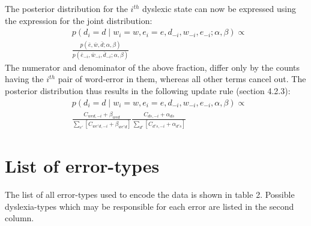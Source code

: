 The posterior distribution for the $i^{th}$ dyslexic state can now be expressed using the expression for the joint distribution:
\begin{equation*}
\begin{split}
&p(d_i=d\mid w_i=w, e_i=e, d_{-i}, w_{-i}, e_{-i}; \alpha, \beta) \propto \\
&\frac{p(\bar{e},\bar{w},\bar{d};\alpha,\beta)}{p(\bar{e}_{-i},\bar{w}_{-i},\bar{d}_{-i};\alpha,\beta)}
\end{split}
\end{equation*}
The numerator and denominator of the above fraction, differ only by the counts having the $i^{th}$ pair of word-error in them, whereas all other terms cancel out. The posterior distribution thus results in the following update rule (section 4.2.3):
\begin{equation*}
\begin{split}
&p(d_i=d\mid w_i=w, e_i=e, d_{-i}, w_{-i}, e_{-i}, \alpha, \beta) \propto \\
&\frac{ C_{wed, -i} + \beta_{wed} } {\sum_{e'} [C_{we'd, -i} + \beta_{we'd}] } \frac{ C_{ds, -i} + \alpha_{ds} } {\sum_{d'}[ C_{d's, -i} + \alpha_{d's}] }
\end{split}
\end{equation*}



\chapter{List of error-types}
The list of all error-types used to encode the data is shown in table 2. Possible dyslexia-types which may be responsible for each error are listed in the second column.


